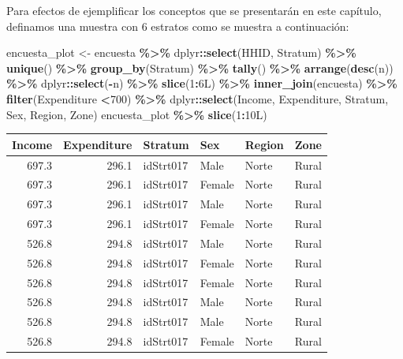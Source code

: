 \documentclass[
  12pt,
]{book}
\newenvironment{Shaded}{\begin{snugshade}}{\end{snugshade}}
\newcommand{\DataTypeTok}[1]{\textcolor[rgb]{0.13,0.29,0.53}{#1}}
\newcommand{\DecValTok}[1]{\textcolor[rgb]{0.00,0.00,0.81}{#1}}
\newcommand{\FunctionTok}[1]{\textcolor[rgb]{0.13,0.29,0.53}{\textbf{#1}}}
\newcommand{\NormalTok}[1]{#1}
\newcommand{\OtherTok}[1]{\textcolor[rgb]{0.56,0.35,0.01}{#1}}
\newcommand{\SpecialCharTok}[1]{\textcolor[rgb]{0.81,0.36,0.00}{\textbf{#1}}}
\begin{document}
Para efectos de ejemplificar los conceptos que se presentarán en este capítulo, definamos una muestra con 6 estratos como se muestra a continuación:

\begin{Shaded}
\begin{Highlighting}[]
\NormalTok{encuesta\_plot }\OtherTok{\textless{}{-}}\NormalTok{ encuesta }\SpecialCharTok{\%\textgreater{}\%}
\NormalTok{  dplyr}\SpecialCharTok{::}\FunctionTok{select}\NormalTok{(HHID, Stratum) }\SpecialCharTok{\%\textgreater{}\%} \FunctionTok{unique}\NormalTok{() }\SpecialCharTok{\%\textgreater{}\%}
  \FunctionTok{group\_by}\NormalTok{(Stratum)  }\SpecialCharTok{\%\textgreater{}\%} \FunctionTok{tally}\NormalTok{() }\SpecialCharTok{\%\textgreater{}\%} 
  \FunctionTok{arrange}\NormalTok{(}\FunctionTok{desc}\NormalTok{(n)) }\SpecialCharTok{\%\textgreater{}\%}\NormalTok{ dplyr}\SpecialCharTok{::}\FunctionTok{select}\NormalTok{(}\SpecialCharTok{{-}}\NormalTok{n) }\SpecialCharTok{\%\textgreater{}\%} 
  \FunctionTok{slice}\NormalTok{(}\DecValTok{1}\SpecialCharTok{:}\DecValTok{6}\DataTypeTok{L}\NormalTok{) }\SpecialCharTok{\%\textgreater{}\%}
  \FunctionTok{inner\_join}\NormalTok{(encuesta) }\SpecialCharTok{\%\textgreater{}\%} \FunctionTok{filter}\NormalTok{(Expenditure }\SpecialCharTok{\textless{}}\DecValTok{700}\NormalTok{) }\SpecialCharTok{\%\textgreater{}\%} 
\NormalTok{  dplyr}\SpecialCharTok{::}\FunctionTok{select}\NormalTok{(Income, Expenditure, Stratum, }
\NormalTok{         Sex, Region, Zone) }
\NormalTok{encuesta\_plot  }\SpecialCharTok{\%\textgreater{}\%} \FunctionTok{slice}\NormalTok{(}\DecValTok{1}\SpecialCharTok{:}\DecValTok{10}\DataTypeTok{L}\NormalTok{)}
\end{Highlighting}
\end{Shaded}

\begin{tabular}{r|r|l|l|l|l}
\hline
Income & Expenditure & Stratum & Sex & Region & Zone\\
\hline
697.3 & 296.1 & idStrt017 & Male & Norte & Rural\\
\hline
697.3 & 296.1 & idStrt017 & Female & Norte & Rural\\
\hline
697.3 & 296.1 & idStrt017 & Male & Norte & Rural\\
\hline
697.3 & 296.1 & idStrt017 & Female & Norte & Rural\\
\hline
526.8 & 294.8 & idStrt017 & Male & Norte & Rural\\
\hline
526.8 & 294.8 & idStrt017 & Female & Norte & Rural\\
\hline
526.8 & 294.8 & idStrt017 & Female & Norte & Rural\\
\hline
526.8 & 294.8 & idStrt017 & Male & Norte & Rural\\
\hline
526.8 & 294.8 & idStrt017 & Male & Norte & Rural\\
\hline
526.8 & 294.8 & idStrt017 & Female & Norte & Rural\\
\hline
\end{tabular}
\end{document}
